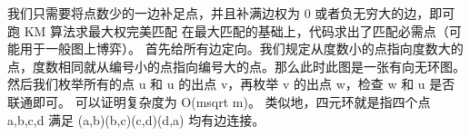 {}\markdownRendererInterblockSeparator
{}
\markdownRendererSectionEnd \markdownRendererSectionBegin
{}\markdownRendererInterblockSeparator
{}我们只需要将点数少的一边补足点，并且补满边权为\markdownRendererDollarSign{} 0 \markdownRendererDollarSign{}或者负无穷大的边，即可跑\markdownRendererDollarSign{} KM\markdownRendererSoftLineBreak
{}\markdownRendererDollarSign{}算法求最大权完美匹配\markdownRendererInterblockSeparator
{}
\markdownRendererSectionEnd 
\markdownRendererSectionEnd \markdownRendererSectionBegin
{}\markdownRendererInterblockSeparator
{}在最大匹配的基础上，代码求出了匹配必需点（可能用于一般图上博弈）。\markdownRendererInterblockSeparator
{}\markdownRendererInterblockSeparator
{}
\markdownRendererSectionEnd 
\markdownRendererSectionEnd \markdownRendererSectionBegin
{}\markdownRendererInterblockSeparator
{}\markdownRendererSectionBegin
{}\markdownRendererInterblockSeparator
{}首先给所有边定向。我们规定从度数小的点指向度数大的点，度数相同就从编号小的点指向编号大的点。那么此时此图是一张有向无环图。\markdownRendererParagraphSeparator
{}然后我们枚举所有的点 \markdownRendererDollarSign{}u\markdownRendererDollarSign{} 和 \markdownRendererDollarSign{}u\markdownRendererDollarSign{} 的出点 \markdownRendererDollarSign{}v\markdownRendererDollarSign{}，再枚举 \markdownRendererDollarSign{}v\markdownRendererDollarSign{} 的出点 \markdownRendererDollarSign{}w\markdownRendererDollarSign{}，检查 \markdownRendererDollarSign{}w\markdownRendererDollarSign{} 和 \markdownRendererDollarSign{}u\markdownRendererDollarSign{} 是否联通即可。\markdownRendererParagraphSeparator
{}可以证明复杂度为 \markdownRendererDollarSign{}O(m\markdownRendererBackslash{}sqrt m)\markdownRendererDollarSign{}。\markdownRendererInterblockSeparator
{}\markdownRendererInterblockSeparator
{}
\markdownRendererSectionEnd \markdownRendererSectionBegin
{}\markdownRendererInterblockSeparator
{}类似地，四元环就是指四个点 \markdownRendererDollarSign{}a,b,c,d\markdownRendererDollarSign{} 满足 \markdownRendererDollarSign{}(a,b)(b,c)(c,d)(d,a)\markdownRendererDollarSign{} 均有边连接。\markdownRendererParagraphSeparator

